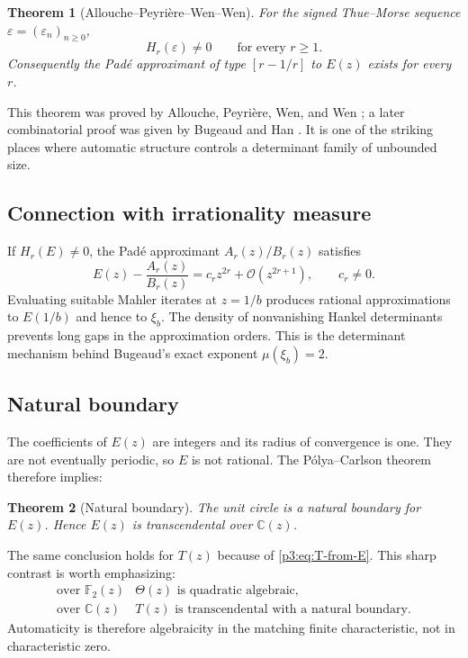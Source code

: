 \documentclass[11pt,oneside]{article}
\newtheorem{theorem}{Theorem}[section]
\theoremstyle{definition}
\theoremstyle{remark}
\newcommand{\C}{\mathbb C}
\newcommand{\Ftwo}{\mathbb F_2}
\newcommand{\bigO}{\mathcal O}
\newcommand{\eps}{\varepsilon}
\begin{document}
\begin{theorem}[Allouche--Peyri\`ere--Wen--Wen]\label{p3:thm:APWW}
For the signed Thue--Morse sequence $\eps=(\eps_n)_{n\ge0}$,
\begin{equation}\label{p3:eq:hankel-nonzero}
 H_r(\eps)\ne0
 \qquad\text{for every }r\ge1.
\end{equation}
Consequently the Pad\'e approximant of type $[r-1/r]$ to $E(z)$ exists for
every $r$.
\end{theorem}

This theorem was proved by Allouche, Peyri\`ere, Wen, and Wen
\cite{p3:apww1998}; a later combinatorial proof was given by Bugeaud and Han
\cite{p3:bugeaudhan2014}.  It is one of the striking places where automatic
structure controls a determinant family of unbounded size.

\subsection{Connection with irrationality measure}

If $H_r(E)\ne0$, the Pad\'e approximant $A_r(z)/B_r(z)$ satisfies
\begin{equation}\label{p3:eq:pade-order}
 E(z)-\frac{A_r(z)}{B_r(z)}
 =c_rz^{2r}+\bigO(z^{2r+1}),
 \qquad c_r\ne0.
\end{equation}
Evaluating suitable Mahler iterates at $z=1/b$ produces rational
approximations to $E(1/b)$ and hence to $\xi_b$.  The density of nonvanishing
Hankel determinants prevents long gaps in the approximation orders.  This is
the determinant mechanism behind Bugeaud's exact exponent
$\mu(\xi_b)=2$.

\subsection{Natural boundary}

The coefficients of $E(z)$ are integers and its radius of convergence is one.
They are not eventually periodic, so $E$ is not rational.  The
P\'olya--Carlson theorem \cite{p3:carlson1921} therefore implies:

\begin{theorem}[Natural boundary]\label{p3:thm:natural-boundary}
The unit circle is a natural boundary for $E(z)$.  Hence $E(z)$ is
transcendental over $\C(z)$.
\end{theorem}

The same conclusion holds for $T(z)$ because of \cref{p3:eq:T-from-E}.  This
sharp contrast is worth emphasizing:
\begin{equation}\label{p3:eq:char-contrast}
 \begin{array}{c|c}
 \text{over }\Ftwo(z)&\Theta(z)\text{ is quadratic algebraic},\\
 \text{over }\C(z)&T(z)\text{ is transcendental with a natural boundary}.
 \end{array}
\end{equation}
Automaticity is therefore algebraicity in the matching finite characteristic,
not in characteristic zero.
\end{document}
